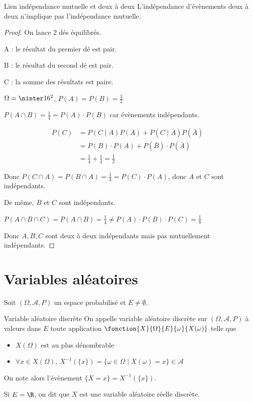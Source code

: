 \begin{proposition}{Lien indépendance mutuelle et deux à deux}{}
    L'indépendance d'évènements deux à deux n'implique pas l'indépendance mutuelle.
\end{proposition}

\begin{proof}
    On lance 2 dés équilibrés.

    A : le résultat du premier dé est pair.

    B : le résultat du second dé est pair.

    C : la somme des résultats est paire.

    $\Omega = \ninter 1 6 ^2$, $P(A) = P(B) = \frac 1 2$

    $P(A \cap B) = \frac 1 4 = P(A) \cdot P(B)$ car évènements indépendants.

    \begin{align}
        P(C) & = P(C \mid A) P(A) + P(C \mid \bar A) P(\bar A) \\
        & = P(B) \cdot P(A) + P(\bar B) \cdot P(\bar A) \\
        & = \frac 1 4 + \frac 1 4 = \frac 1 2 
    \end{align} 

    Donc $P(C \cap A) = P(B \cap A) = \frac 1 4 = P(C) \cdot P(A)$, donc 
    $A$ et $C$ sont indépendants.

    De même, $B$ et $C$ sont indépendants.

    $P(A \cap B \cap C) = P(A \cap B) = \frac 1 4 \neq P(A) \cdot P(B) \cdot P(C) = \frac 1 8$

    Donc $A, B, C$ sont deux à deux indépendants mais pas mutuellement indépendants.
\end{proof}

\section{Variables aléatoires }

Soit $(\Omega, \mathcal A, P)$ un espace probabilisé et $E \neq \emptyset$. 

\begin{definition}{Variable aléatoire discrète}{}
    On appelle variable aléatoire discrète sur $(\Omega, \mathcal A, P)$ à valeurs dans $E$
    toute application $\fonction{X}{\Omega}{E}{\omega}{X(\omega)}$ telle que 
    \begin{itemize}
        \item $X(\Omega)$ est au plus dénombrable
        \item $\forall x \in X(\Omega), \, X^{-1}(\{x\}) = \{\omega \in \Omega \mid X(\omega) = x\} \in \mathcal A$
    \end{itemize}

    On note alors l'évènement $\{X = x\} = X^{-1}(\{x\})$.
    
    Si $E = \R$, on dit que $X$ est une variable aléatoire réelle discrète.
\end{definition}

